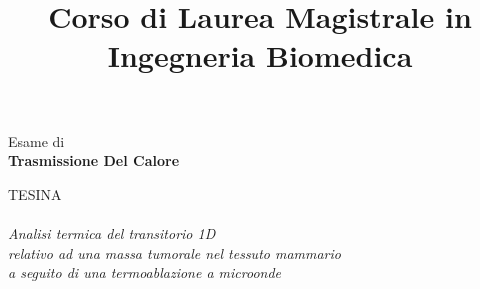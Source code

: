 \documentclass[11pt]{article}
\begin{document}
	\linespread{1.2}
	
	
	
	\begin{titlepage}
		\title{ Corso di Laurea Magistrale in\\ \textbf{Ingegneria Biomedica} }
		\date{\vspace{-10ex}}
	\end{titlepage}  
	\author{}
	\maketitle
	
	
	
	\begin{center}
		\LARGE{Esame di\\ \textbf{Trasmissione Del Calore}} 
	\end{center}
	
	\vspace{0.5cm}
	
	\begin{center}
		\vspace{1.5cm}
		\Large{\textsc{TESINA\\}
			\textit{\\Analisi termica del transitorio 1D\\ relativo ad una massa tumorale nel tessuto mammario\\ a seguito di una termoablazione a microonde\\}}
		
	  \end{center}
\end{document}
